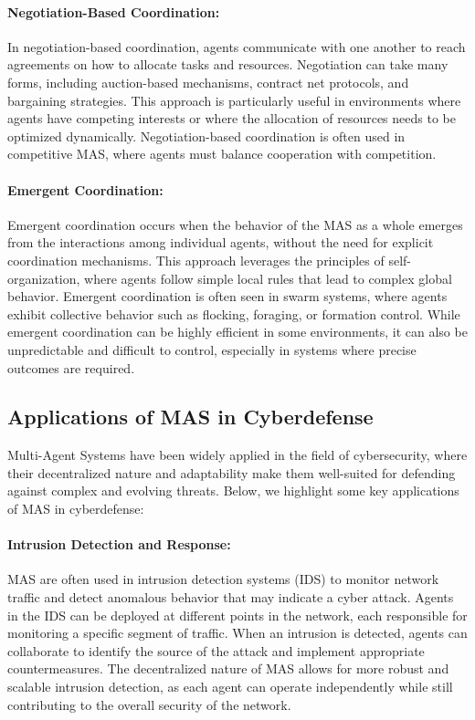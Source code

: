 \paragraph{Negotiation-Based Coordination:}
In negotiation-based coordination, agents communicate with one another to reach agreements on how to allocate tasks and resources. Negotiation can take many forms, including auction-based mechanisms, contract net protocols, and bargaining strategies. This approach is particularly useful in environments where agents have competing interests or where the allocation of resources needs to be optimized dynamically. Negotiation-based coordination is often used in competitive MAS, where agents must balance cooperation with competition.

\paragraph{Emergent Coordination:}
Emergent coordination occurs when the behavior of the MAS as a whole emerges from the interactions among individual agents, without the need for explicit coordination mechanisms. This approach leverages the principles of self-organization, where agents follow simple local rules that lead to complex global behavior. Emergent coordination is often seen in swarm systems, where agents exhibit collective behavior such as flocking, foraging, or formation control. While emergent coordination can be highly efficient in some environments, it can also be unpredictable and difficult to control, especially in systems where precise outcomes are required.

\subsection{Applications of MAS in Cyberdefense}

Multi-Agent Systems have been widely applied in the field of cybersecurity, where their decentralized nature and adaptability make them well-suited for defending against complex and evolving threats. Below, we highlight some key applications of MAS in cyberdefense:

\paragraph{Intrusion Detection and Response:}
MAS are often used in intrusion detection systems (IDS) to monitor network traffic and detect anomalous behavior that may indicate a cyber attack. Agents in the IDS can be deployed at different points in the network, each responsible for monitoring a specific segment of traffic. When an intrusion is detected, agents can collaborate to identify the source of the attack and implement appropriate countermeasures. The decentralized nature of MAS allows for more robust and scalable intrusion detection, as each agent can operate independently while still contributing to the overall security of the network.

